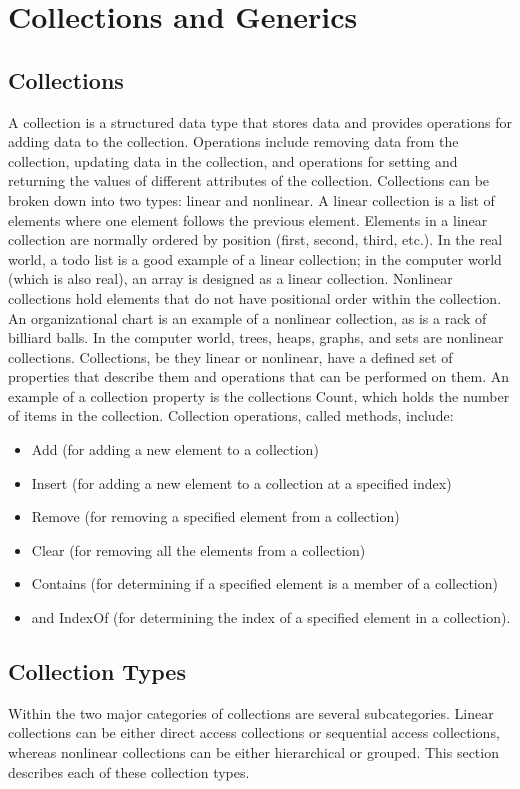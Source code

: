\documentclass[12pt,a4paper,final,twoside,titlepage]{book}
\begin{document}
\chapter{Collections and Generics}
\section{Collections}
A collection is a structured data type that stores data and provides operations for adding data to the collection. Operations include removing data from the collection, updating data in the collection, and operations for setting and returning the values of different attributes of the collection.
Collections can be broken down into two types: linear and nonlinear. A linear collection is a list of elements where one element follows the previous element. Elements in a linear collection are normally ordered by position (first, second, third, etc.). In the real world, a todo list is a good example of a linear collection; in the computer world (which is also real), an array is designed as a linear collection.
Nonlinear collections hold elements that do not have positional order within the collection. An organizational chart is an example of a nonlinear collection, as is a rack of billiard balls. In the computer world, trees, heaps, graphs, and sets are nonlinear collections.
Collections, be they linear or nonlinear, have a defined set of properties that describe them and operations that can be performed on them. An example of a collection property is the collections Count, which holds the number of items in the collection. Collection operations, called methods, include:
\begin{itemize}
\item Add (for adding a new element to a collection)
\item Insert (for adding a new element to a collection at a specified index)
\item Remove (for removing a specified element from a collection)
\item Clear (for removing all the elements from a collection)
\item Contains (for determining if a specified element is a member of a collection)
\item and IndexOf (for determining the index of a specified element in a collection).
\end{itemize} 
\section{Collection Types}
Within the two major categories of collections are several subcategories. Linear collections can be either direct access collections or sequential access collections, whereas nonlinear collections can be either hierarchical or grouped. This section describes each of these collection types.
\end{document}
